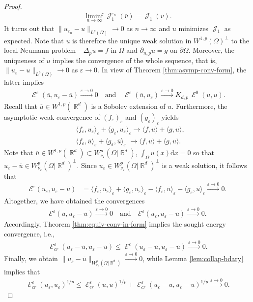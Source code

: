 \documentclass[12pt, reqno]{amsart}%
\theoremstyle{plain}  %
\theoremstyle{definition}  %
\numberwithin{equation}{section}
\DeclareMathOperator{\cE}{\mathcal{E}}
\DeclareMathOperator{\cJ}{\mathcal{J}}
\DeclareMathOperator{\R}{\mathbb{R}}
\renewcommand{\d}{\mathrm{d}}
\newcommand{\eps}{\varepsilon}
\newcommand{\WnuOmRa}{W^p_{\nu_\eps}(\Omega|\R^d )}
\begin{document}
\begin{proof}
\begin{align*}
\liminf_{n\to \infty} \cJ^{\eps_n}_1(\overline{v})= \cJ_1(v).
\end{align*}
It turns out that $\|u_{\eps_n}-u\|_{L^p(\Omega)}\to 0$ as $n\to\infty$ and  $u$ minimizes $\cJ_1$ as expected. Note that $u$ is therefore the unique weak solution in $W^{1,p}(\Omega)^\perp$  to the local Neumann problem $-\Delta_p u=f$ in $\Omega$ and $\partial_{n,p}u=g$ on $\partial\Omega$. Moreover, the uniqueness of $u$ implies  the convergence of the whole sequence, that is, $\|u_{\eps}-u\|_{L^p(\Omega)}\to 0$ as $\eps\to0$.   In view of Theorem \ref{thm:asymp-conv-form}, the latter implies
\begin{align*}
\cE^\eps(\overline{u},u_\eps-\overline{u}) \xrightarrow{\eps\to0}0\quad\text{and}\quad
\cE^\eps(\overline{u},u_\eps)\xrightarrow{\eps\to0}  K_{d,p}\,\cE^0(u,u).
\end{align*}
Recall that $\overline{u}\in W^{1,p}(\R^d)$ is a Sobolev extension of $u$. Furthermore,  the asymptotic weak convergence of  $ (f_\eps)_\eps$ and $ (g_\eps)_\eps$ yields
\begin{align*}
& \langle  f_\eps ,u_\eps \rangle_\eps + \langle   g_\eps, u_\eps \rangle_\eps\to  \langle  f ,u \rangle+ \langle   g, u  \rangle,\\
& \langle  f_\eps ,\overline{u} \rangle_\eps + \langle   g_\eps, \overline{u}  \rangle_\eps\,\, \to  \langle  f ,u \rangle+ \langle   g, u \rangle.
\end{align*}
Note that $\overline{u}\in W^{1,p}(\R^d)\subset \WnuOmRa$, $\int_\Omega u(x)\d x= 0$ so that  $u_\eps-\overline{u}\in \WnuOmRa^\perp$. Since $u_\eps \in \WnuOmRa^\perp$ is a weak solution, it follows that
\begin{align*}
\mathcal{E}^\eps(u_\eps,u_\eps-\overline{u})
&=\langle  f_\eps ,u_\eps \rangle_\eps + \langle   g_\eps, u_\eps  \rangle_\eps- \langle  f_\eps, \overline{u} \rangle_\eps - \langle   g_\eps, \overline{u}  \rangle_\eps
\xrightarrow{\eps\to0}0.
\end{align*}
Altogether,  we have obtained  the convergences
\begin{align*}
\mathcal{E}^\eps(\overline{u},u_\eps-\overline{u}) \xrightarrow{\eps\to0}0 \quad\text{and}\quad 	\mathcal{E}^\eps(u_\eps, u_\eps-\overline{u}) \xrightarrow{\eps\to0}0.
\end{align*}
Accordingly, Theorem \ref{thm:equiv-conv-in-form} implies the  sought energy convergence, i.e.,
\begin{align*}
\cE^\eps_{cr}(u_\eps-\overline{u}, u_\eps-\overline{u})\leq \cE^\eps(u_\eps-\overline{u}, u_\eps-\overline{u}) \xrightarrow{\eps\to0}0.
\end{align*}
Finally, we obtain  $\|u_\eps-\overline{u}\|_{\WnuOmRa} \xrightarrow{\eps\to0}0$, while Lemma  \ref{lem:collap-bdary} implies that
\begin{align*}
\cE^\eps_{cr}(u_\eps, u_\eps)^{1/p}\leq \cE^\eps_{cr}(\overline{u}, \overline{u})^{1/p}+ \cE^\eps_{cr}(u_\eps-\overline{u}, u_\eps-\overline{u})^{1/p}\xrightarrow{\eps\to0}0.
\end{align*}
\end{proof}
\end{document}
